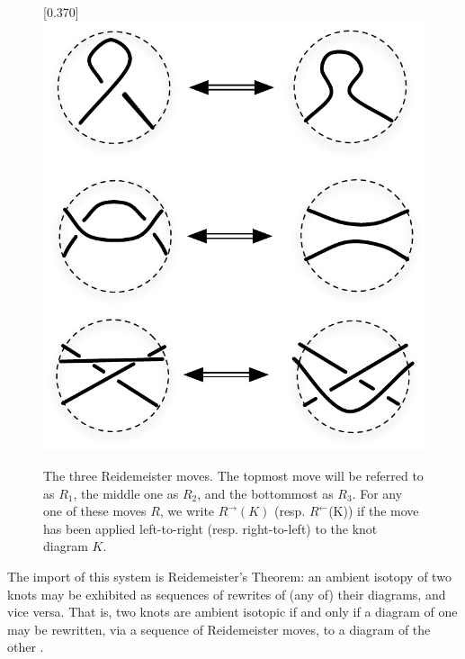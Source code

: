 \begin{figure}[hbt]
    \centering
    \scalebox{0.37}[0.370]{\includegraphics[viewport=0 0 390 360]{../../illustrations/Reidemeister123vert.pdf}}
    \caption{ The three Reidemeister moves. The topmost move will be referred to as $R_1$, the middle one as $R_2$, and the bottommost as $R_3$. For any one of these moves $R$, we write $R^{\to}(K)$ (resp. $R^\leftarrow$(K)) if the move has been applied left-to-right (resp. right-to-left)  to the knot diagram $K$.}
\label{fig:RMoves}
\end{figure}

The import of this system is Reidemeister's Theorem: an ambient
isotopy of two knots may be exhibited as sequences of rewrites of (any of) their
diagrams, and vice versa. That is, two knots are ambient isotopic if and only if a
diagram of one may be rewritten, via a sequence of Reidemeister
moves, to a diagram of the other \cite{LivingstonText}.



